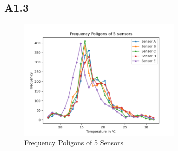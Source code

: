 \documentclass[a4paper,12pt]{article}
\begin{document}
 \subsection{A1.3}
  \begin{figure}[H] 
	\centering
	\includegraphics[width=0.7\textwidth]{Frequency Poligons of 5 Sensors.png}
	\caption{Frequency Poligons of 5 Sensors\cite{Maiullari2020}}
  \end{figure}
\end{document}
